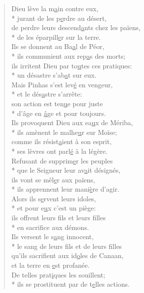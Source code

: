 \begin{verse}
Dieu lève la m\underline{a}in contre eux, \\*
jurant de les p\underline{e}rdre au désert, \\
de perdre leurs descend\underline{a}nts chez les païens, \\*
de les éparpill\underline{e}r sur la terre. \\

Ils se donnent au Ba\underline{a}l de Péor, \\*
ils communient aux rep\underline{a}s des morts; \\
ils irritent Dieu par to\underline{u}tes ces pratiques: \\*
un désastre s’ab\underline{a}t sur eux. \\

Mais Pinhas s’est lev\underline{é} en vengeur, \\*
et le dés\underline{a}stre s’arrête: \\
son action est ten\underline{u}e pour juste \\*
d’âge en \underline{â}ge et pour toujours. \\

Ils provoquent Dieu aux ea\underline{u}x de Mériba, \\*
ils amènent le malhe\underline{u}r sur Moïse; \\
comme ils résist\underline{a}ient à son esprit, \\*
ses lèvres ont parl\underline{é} à la légère. \\

Refusant de supprim\underline{e}r les peuples \\*
que le Seigneur leur av\underline{a}it désignés, \\
ils vont se mêl\underline{e}r aux païens, \\*
ils apprennent leur mani\underline{è}re d’agir. \\

Alors ils s\underline{e}rvent leurs idoles, \\*
et pour e\underline{u}x c’est un piège: \\
ils offrent leurs f\underline{i}ls et leurs filles \\*
en sacrif\underline{i}ce aux démons. \\

Ils versent le s\underline{a}ng innocent, \\*
le sang de leurs f\underline{i}ls et de leurs filles \\
qu’ils sacrifient aux id\underline{o}les de Canaan, \\
et la terre en \underline{e}st profanée. \\
De telles prat\underline{i}ques les souillent; \\*
ils se prostituent par de t\underline{e}lles actions. \\


\end{verse}
